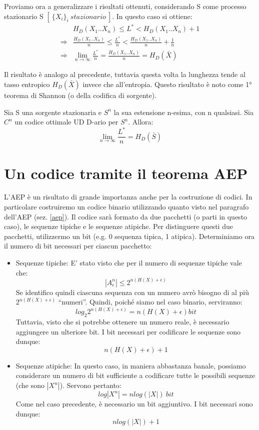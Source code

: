 Proviamo ora a generalizzare i risultati ottenuti, considerando S come processo stazionario S $[ \ \{X_i\}_i \ stazionario \ ]$.
In questo caso si ottiene:
\[
 \begin{split} 
 & H_D(X_1..X_n) \le L^* < H_D(X_1..X_n)+1 \\
 \Rightarrow & \frac{H_D(X_1..X_n)}{n} \le \frac{L^*}{n} < \frac{H_D(X_1..X_n)}{n} + \frac{1}{n} \\
 \Rightarrow & \lim_{n \to \infty} \frac{L^*}{n}=\frac{H_D(X_1..X_n)}{n}=H_D(\bar{X})  
  \end{split}
\]

Il risultato è analogo al precedente, tuttavia questa volta la lunghezza tende al tasso entropico $H_D(\bar{X})$ invece che all'entropia.
Questo risultato è noto come 1° teorema di Shannon (o della codifica di sorgente).

\begin{teorema}
 Sia S una sorgente stazionaria e $S^n$ la sua estensione n-esima, con n qualsiasi. Sia $C^n$ un codice ottimale UD D-ario per $S^n$.
 Allora:
 \[
  \lim_{n \to \infty} \frac{L^*}{n}=H_D(\bar{S})  
 \]

\end{teorema}

\section{Un codice tramite il teorema AEP}
L'AEP è un risultato di grande importanza anche per la costruzione di codici.
In particolare costruiremo un codice binario utilizzando quanto visto nel paragrafo dell'AEP (sez. \ref{aep}).
Il codice sarà formato da due pacchetti (o parti in questo caso), le sequenze tipiche e le sequenze atipiche.
Per distinguere questi due pacchetti, utilizzermo un bit (e.g. 0 sequenza tipica, 1 atipica).
Determiniamo ora il numero di bit necessari per ciascun pacchetto:
\begin{itemize}
 \item Sequenze tipiche: E' stato visto che per il numero di sequenze tipiche vale che:
       \[
        | A_{\epsilon}^n| \le 2^{n(H(X)+\epsilon)}
       \]
       Se identifico quindi ciascuna sequenza con un numero avrò bisogno di al più $2^{n(H(X)+\epsilon)}$ ``numeri''.
       Quindi, poiché siamo nel caso binario, serviranno:
       \[
        log_2 2^{n(H(X)+\epsilon)}=n(H(X)+\epsilon) bit
       \]
       Tuttavia, visto che si potrebbe ottenere un numero reale, è necessario aggiungere un ulteriore bit.
       I bit necessari per codificare le sequenze sono dunque:
       \[
        n(H(X)+\epsilon)+1
       \]


 \item Sequenze atipiche: In questo caso, in maniera abbastanza banale, possiamo considerare un numero di bit sufficiente 
       a codificare tutte le possibili sequenze (che sono $|X^n|$).
       Servono pertanto:
       \[
         log|X^n|=nlog(|X|) \ bit
       \]
       Come nel caso precedente, è necessario un bit aggiuntivo. I bit necessari sono dunque:
       \[
        n log(|X|)+1
       \]

\end{itemize}

